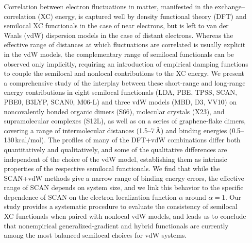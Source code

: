 Correlation between electron fluctuations in matter, manifested in the exchange--correlation (XC) energy, is captured well by density functional theory (DFT) and semilocal XC functionals in the case of near electrons, but is left to van der Waals (vdW) dispersion models in the case of distant electrons.
Whereas the effective range of distances at which fluctuations are correlated is usually explicit in the vdW models, the complementary range of semilocal functionals can be observed only implicitly, requiring an introduction of empirical damping functions to couple the semilocal and nonlocal contributions to the XC energy.
We present a comprehensive study of the interplay between these short-range and long-range energy contributions in eight semilocal functionals (LDA, PBE, TPSS, SCAN, PBE0, B3LYP, SCAN0, M06-L) and three vdW models (MBD, D3, VV10) on noncovalently bonded organic dimers (S66), molecular crystals (X23), and supramolecular complexes (S12L), as well as on a series of graphene-flake dimers, covering a range of intermolecular distances (1.5--7\,\AA) and binding energies (0.5--130\,kcal/mol).
The profiles of many of the DFT+vdW combinations differ both quantitatively and qualitatively, and some of the qualitative differences are independent of the choice of the vdW model, establishing them as intrinsic properties of the respective semilocal functionals.
We find that while the SCAN+vdW methods give a narrow range of binding energy errors, the effective range of SCAN depends on system size, and we link this behavior to the specific dependence of SCAN on the electron localization function $\alpha$ around $\alpha=1$.
Our study provides a systematic procedure to evaluate the consistency of semilocal XC functionals when paired with nonlocal vdW models, and leads us to conclude that nonempirical generalized-gradient and hybrid functionals are currently among the most balanced semilocal choices for vdW systems.
